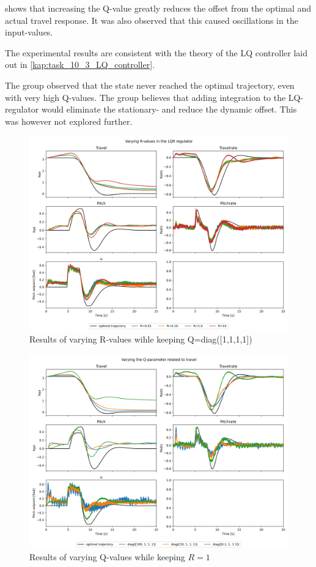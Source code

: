 \documentclass[../main.tex]{subfiles}
\begin{document}
 shows that increasing the Q-value greatly reduces the offset from the optimal and actual travel response. It was also observed that this caused oscillations in the input-values.

The experimental results are consistent with the theory of the LQ controller laid out in \cref{kap:task_10_3_LQ_controller}.

The group observed that the state never reached the optimal trajectory, even with very high Q-values. The group believes that adding integration to the LQ-regulator would eliminate the stationary- and reduce the dynamic offset. This was however not explored further.

\begin{figure}[h]
    \includegraphics[width=\linewidth]{figures/LAB3_R_variations.png}
	\caption{Results of varying R-values wihle keeping Q=diag([1,1,1,1])}
	\label{fig:LAB3_R_variations}
\end{figure}

\begin{figure}[h]
	\includegraphics[width=\linewidth]{figures/LAB3_Q_variations.png}
	\caption{Results of varying Q-values while keeping $R=1$}
	\label{fig:LAB3_Q_variations_travel}
\end{figure}
\end{document}
